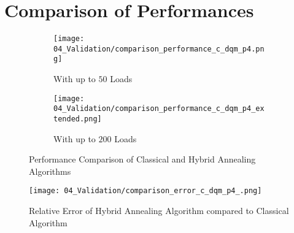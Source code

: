 \section{Comparison of Performances}
\label{validation:comparison}


\begin{figure}
  \begin{subfigure}[b]{0.5 \textwidth}
    \centering
    \texttt{[image: 04\_Validation/comparison\_performance\_c\_dqm\_p4.png]}
    \caption{With up to $50$ Loads}
    \label{figure:validation.performance.comparison}
  \end{subfigure}
  \begin{subfigure}[b]{0.5 \textwidth}
    \centering
    \texttt{[image: 04\_Validation/comparison\_performance\_c\_dqm\_p4\_extended.png]}
    \caption{With up to $200$ Loads}
    \label{figure:validation.comparison.performance.extended}
  \end{subfigure}
  \caption{Performance Comparison of Classical and Hybrid Annealing Algorithms}
\end{figure}

\begin{figure}
  \centering
  \texttt{[image: 04\_Validation/comparison\_error\_c\_dqm\_p4\_.png]}
  \caption{Relative Error of Hybrid Annealing Algorithm compared to Classical Algorithm}
\end{figure}
